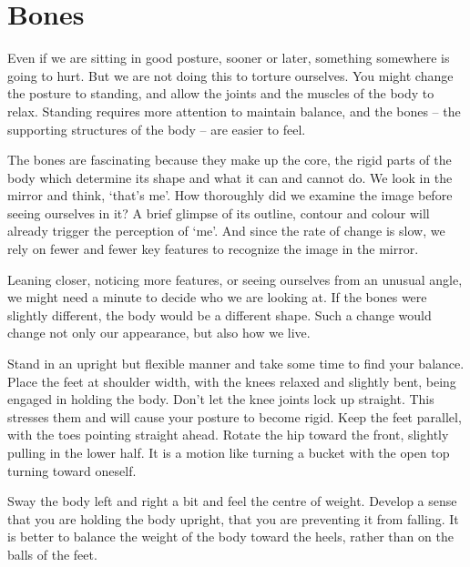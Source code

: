 \chapter{Bones}


Even if we are sitting in good posture, sooner or later, something
somewhere is going to hurt. But we are not doing this to torture
ourselves. You might change the posture to standing, and allow the
joints and the muscles of the body to relax. Standing requires more
attention to maintain balance, and the bones -- the supporting
structures of the body -- are easier to feel.

The bones are fascinating because they make up the core, the rigid parts
of the body which determine its shape and what it can and cannot do. We
look in the mirror and think, `that's me'. How thoroughly did we examine
the image before seeing ourselves in it? A brief glimpse of its outline,
contour and colour will already trigger the perception of `me'. And
since the rate of change is slow, we rely on fewer and fewer key
features to recognize the image in the mirror.

Leaning closer, noticing more features, or seeing ourselves from an
unusual angle, we might need a minute to decide who we are looking at.
If the bones were slightly different, the body would be a different
shape. Such a change would change not only our appearance, but also how
we live.

\clearpage
\thispagestyle{empty}\mbox{}
\clearpage


Stand in an upright but flexible manner and take some time to find your
balance. Place the feet at shoulder width, with the knees relaxed and
slightly bent, being engaged in holding the body. Don't let the knee
joints lock up straight. This stresses them and will cause your posture
to become rigid. Keep the feet parallel, with the toes pointing straight
ahead. Rotate the hip toward the front, slightly pulling in the lower
half. It is a motion like turning a bucket with the open top turning
toward oneself.

Sway the body left and right a bit and feel the centre of weight.
Develop a sense that you are holding the body upright, that you are
preventing it from falling. It is better to balance the weight of the
body toward the heels, rather than on the balls of the feet.

